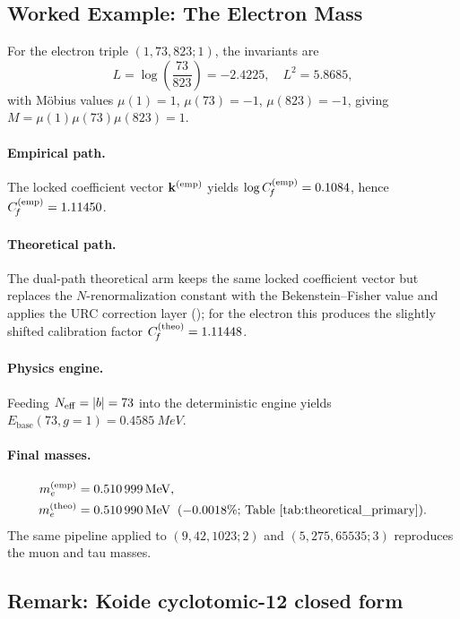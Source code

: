 \documentclass[11pt]{article}
\theoremstyle{remark}
\newcommand{\mob}{\mu}
\newcommand{\Cf}{C_{\!f}}
\begin{document}
\subsection{Worked Example: The Electron Mass}
\label{subsec:worked_example}

For the electron triple $(1, 73, 823; 1)$, the invariants are
\[
L = \log\!\left(\frac{73}{823}\right) = -2.4225, \quad L^2 = 5.8685,
\]
with M\"obius values $\mob(1) = 1$, $\mob(73) = -1$, $\mob(823) = -1$, giving $M = \mob(1)\mob(73)\mob(823) = 1$.

\paragraph{Empirical path.}
The locked coefficient vector $\mathbf{k}^{(\rm emp)}$ yields $\log \Cf^{(\rm emp)} = 0.1084$, hence $\Cf^{(\rm emp)} = 1.11450$.
\paragraph{Theoretical path.}
The dual-path theoretical arm keeps the same locked coefficient vector but replaces the $N$-renormalization constant with the Bekenstein--Fisher value and applies the URC correction layer (); for the electron this produces the slightly shifted calibration factor $\Cf^{(\rm theo)} = 1.11448$.
\paragraph{Physics engine.}
Feeding $N_{\rm eff} = |b| = 73$ into the deterministic engine yields $E_{\mathrm{base}}(73, g{=}1) = \SI{0.4585}{MeV}$.
\paragraph{Final masses.}
\[
\begin{aligned}
m_e^{(\rm emp)} &= \SI{0.510999}{MeV}, \\
m_e^{(\rm theo)} &= \SI{0.510990}{MeV} \;\;(\text{$-0.0018\%$; Table~\ref{tab:theoretical_primary}}).
\end{aligned}
\]
The same pipeline applied to $(9, 42, 1023; 2)$ and $(5, 275, 65535; 3)$ reproduces the muon and tau masses.


\subsection{Remark: Koide cyclotomic-12 closed form}
\label{subsec:koide_closed}
\end{document}
